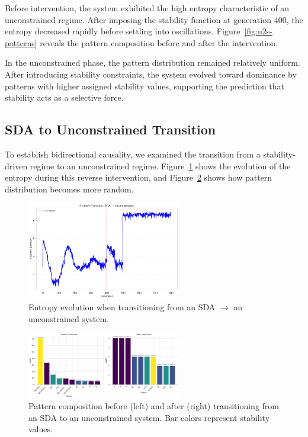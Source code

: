\documentclass[preprint,12pt]{elsarticle}
\begin{document}
Before intervention, the system exhibited the high entropy characteristic of an unconstrained regime. After imposing the stability function at generation 400, the entropy decreased rapidly before settling into oscillations. Figure~\ref{fig:u2s-patterns} reveals the pattern composition before and after the intervention.

In the unconstrained phase, the pattern distribution remained relatively uniform. After introducing stability constraints, the system evolved toward dominance by patterns with higher assigned stability values, supporting the prediction that stability acts as a selective force.

\subsection{SDA to Unconstrained Transition}

To establish bidirectional causality, we examined the transition from a stability-driven regime to an unconstrained regime. Figure~\ref{fig:s2u-entropy} shows the evolution of the entropy during this reverse intervention, and Figure~\ref{fig:s2u-patterns} shows how pattern distribution becomes more random.

\begin{figure}[h]
    \centering
    \includegraphics[width=0.6\textwidth]{figure_8.png}
    \caption{Entropy evolution when transitioning from an SDA $\to$ an unconstrained system.}
    \label{fig:s2u-entropy}
\end{figure}

\begin{figure}[h]
    \centering
    \includegraphics[width=0.6\textwidth]{figure_9.png}
    \caption{Pattern composition before (left) and after (right) transitioning from an SDA to an unconstrained system. Bar colors represent stability values.}
    \label{fig:s2u-patterns}
\end{figure}
\end{document}
